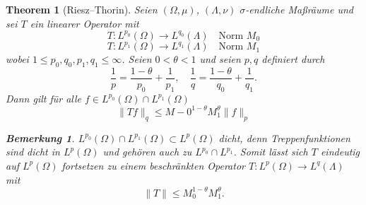 \documentclass[
paper=a4,
bibtotocnumbered,
liststotocnumbered,
tablecaptionabove,
pointlessnumbers,
twoside,
openright,
10pt
]
{report}
\newtheorem{thm}{Theorem}[chapter]
\theoremstyle{definition}
\newtheorem*{rem}{Bemerkung}
\numberwithin{equation}{chapter}
\begin{document}
\begin{thm}[Riesz--Thorin]\label{st3}
Seien $(\Omega, \mu)$, $(\Lambda,\nu)$ $\sigma$-endliche Maßräume und sei $T$ ein linearer Operator mit
\begin{equation}
T: L^{p_0} (\Omega) \to L^{q_0} (\Lambda)\quad \text{Norm } M_0
\end{equation}
\begin{equation}
T: L^{p_1} (\Omega) \to L^{q_1} (\Lambda)\quad \text{Norm } M_1
\end{equation}
wobei $1\le p_0, q_0, p_1, q_1\le \infty$. Seien $0<\theta <1$ und seien $p,q$ definiert durch
\begin{equation}
\frac{1}{p} = \frac{1-\theta}{p_0} + \frac{1}{p_1}, \quad \frac{1}{q} = \frac{1-\theta}{q_0} + \frac{1}{q_1}.
\end{equation}
Dann gilt für alle $f\in L^{p_0}(\Omega) \cap L^{p_1}(\Omega)$
\begin{equation}
\| Tf\|_q \le M-0^{1-\theta} M_1^\theta \| f\|_p
\end{equation}
\begin{rem}
$L^{p_0}(\Omega) \cap L^{p_1} (\Omega) \subset L^p(\Omega)$ dicht, denn Treppenfunktionen sind dicht in $L^p(\Omega)$ und gehören auch zu $L^{p_0} \cap L^{p_1}$. Somit lässt sich $T$ eindeutig auf $L^p(\Omega)$ fortsetzen zu einem beschränkten Operator $T:L^p(\Omega) \to L^q(\Lambda)$ mit 
\begin{equation}
\| T\| \le M_0^{1-\theta} M_1^\theta.
\end{equation}
\end{rem}
\end{thm}
\end{document}
